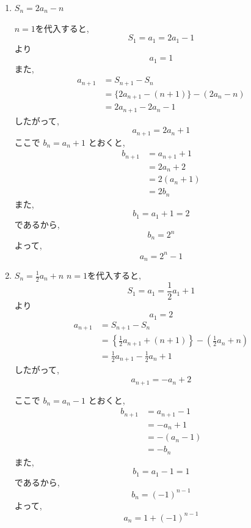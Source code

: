     \begin{enumerate}[label=(\arabic*),parsep=3pt]
    \item $\displaystyle S_n=2a_n-n$

        $n=1$を代入すると,
        \[
          S_1=a_1=2a_1-1
        \]
        より
        \[
          a_1=1
        \]
        また,
        \begin{align*}
          a_{n+1}
            &=S_{n+1}-S_n\\
            &=\{2a_{n+1}-(n+1)\}-(2a_n-n)\\
            &=2a_{n+1}-2a_n-1
        \end{align*}
        したがって,
        \[
          a_{n+1}=2a_n+1
        \]
        ここで $b_n=a_n+1$ とおくと,
        \begin{align*}
          b_{n+1}
            &=a_{n+1}+1\\
            &=2a_n+2\\
            &=2(a_n+1)\\
            &=2b_n
        \end{align*}
        また,
        \[
          b_1=a_1+1=2
        \]
        であるから,
        \[
          b_n=2^n
        \]
        よって,
        \[
          a_n=2^n-1
        \]
    \item $\displaystyle S_n=\frac12a_n+n$
        $n=1$を代入すると,
        \[
          S_1=a_1=\frac12a_1+1
        \]
        より
        \[
          a_1=2
        \]
        \begin{align*}
          a_{n+1}
            &=S_{n+1}-S_n\\
            &=\left\{\frac12a_{n+1}+(n+1)\right\}-\left(\frac12a_n+n\right)\\
            &=\frac12a_{n+1}-\frac12a_n+1
        \end{align*}
        したがって,
        \[
          a_{n+1}=-a_n+2
        \]

        ここで $b_n=a_n-1$ とおくと,
        \begin{align*}
          b_{n+1}
            &=a_{n+1}-1\\
            &=-a_n+1\\
            &=-(a_n-1)\\
            &=-b_n
        \end{align*}
        また,
        \[
          b_1=a_1-1=1
        \]
        であるから,
        \[
          b_n=(-1)^{n-1}
        \]
        よって,
        \[
          a_n=1+(-1)^{n-1}
        \]

    \end{enumerate}

